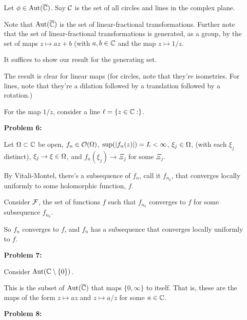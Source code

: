 \documentclass[a4paper,12pt]{article}
\begin{document}
Let $\phi \in \text{Aut}(\overline{\mathbb{C}})$. Say $\mathcal{C}$ is the set of all circles and lines in the complex plane.

Note that $\text{Aut}(\overline{\mathbb{C}})$ is the set of linear-fractional transformations. Further note that the set of linear-fractional transformations is generated, as a group, by the set of maps $z \mapsto az+b$ (with $a,b \in \mathbb{C}$ and the map $z \mapsto 1/z$.

It suffices to show our result for the generating set.

The result is clear for linear maps (for circles, note that they're isometries. For lines, note that they're a dilation followed by a translation followed by a rotation.) 

For the map $1/z$, consider a line $\ell = \{z \in \mathbb{C}: \}$. %

\shunt

{\bf Problem 6:}

Let $\Omega \subset \mathbb{C}$ be open, $f_n \in \mathcal{O}(\Omega)$, $\sup(\left\lvert f_n(z) \right\rvert) = L < \infty$, $\xi_j \in \Omega$, (with each $\xi_j$ distinct), $\xi_j \to \xi \in \Omega$, and $f_n(\xi_j) \to \Xi_j$ for some $\Xi_j$.

By Vitali-Montel, there's a subsequence of $f_n$, call it $f_{n_k}$, that converges locally uniformly to some holomorphic function, $f$.

Consider $\mathcal{F}$, the set of functions $f$ such that $f_{n_k}$ converges to $f$ for some subsequence $f_{n_k}$. %

So $f_n$ converges to $f$, and $f_n$ has a subsequence that converges locally uniformly to $f$. %

\shunt

{\bf Problem 7:}

Consider $\text{Aut}(\mathbb{C} \setminus \{0\})$.

This is the subset of $\text{Aut}(\overline{\mathbb{C}})$ that maps $\{0,\infty\}$ to itself. That is, these are the maps of the form $z \mapsto az$ and $z \mapsto a/z$ for some $a \in \mathbb{C}$. %

\shunt

{\bf Problem 8:}

\shunt
\end{document}

